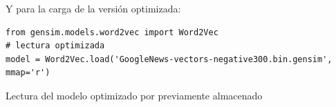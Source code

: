 Y para la carga de la versión optimizada:
\nopagebreak
\begin{listing}[H]
\begin{verbatim}
from gensim.models.word2vec import Word2Vec
# lectura optimizada
model = Word2Vec.load('GoogleNews-vectors-negative300.bin.gensim', mmap='r')
\end{verbatim}
\caption{Lectura del modelo optimizado por  previamente almacenado}
\label{lst:word2vec-load}
\end{listing}
